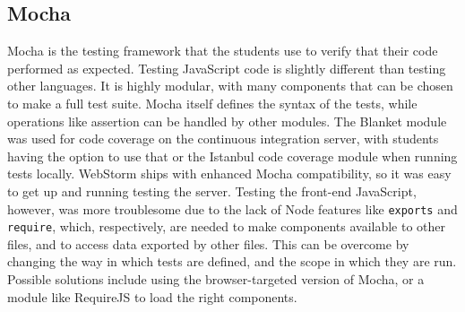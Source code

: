 \documentclass[12pt]{article}
\newcommand{\code}[1]{{\texttt {#1}}}
\begin{document}
\subsection{Mocha}\label{sec:mocha}
Mocha\cite{Mocha} is the testing framework that the students use to verify that their code performed as expected. Testing JavaScript code is slightly different than testing other languages. It is highly modular, with many components that can be chosen to make a full test suite. Mocha itself defines the syntax of the tests, while operations like assertion can be handled by other modules. The Blanket module was used for code coverage on the continuous integration server, with students having the option to use that or the Istanbul code coverage module when running tests locally. WebStorm ships with enhanced Mocha compatibility, so it was easy to get up and running testing the server. Testing the front-end JavaScript, however, was more troublesome due to the lack of Node features like \code{exports} and \code{require}, which, respectively, are needed to make components available to other files, and to access data exported by other files. This can be overcome by changing the way in which tests are defined, and the scope in which they are run. Possible solutions include using the browser-targeted version of Mocha, or a module like RequireJS to load the right components.
\end{document}
